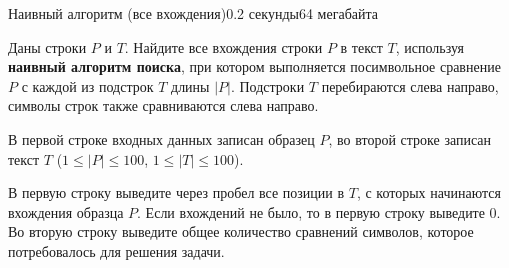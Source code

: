 \begin{problem}{Наивный алгоритм (все вхождения)}{}{}{0.2 секунды}{64 мегабайта}

Даны строки $P$ и $T$. Найдите все вхождения строки $P$ в текст $T$, используя {\bf наивный алгоритм поиска}, 
при котором выполняется посимвольное сравнение $P$ с каждой из подстрок $T$ длины $|P|$.
Подстроки $T$ перебираются слева направо, символы строк также сравниваются слева направо. 

\InputFile
В первой строке входных данных записан образец $P$, 
во второй строке записан текст $T$ ($1 \le |P| \le 100$, $1 \le |T| \le 100$).


\OutputFile
В первую строку выведите через пробел все позиции в $T$, с которых начинаются вхождения образца $P$. 
Если вхождений не было, то в первую строку выведите 0.
Во вторую строку выведите общее количество сравнений символов, которое потребовалось для решения задачи. 

\Examples

\begin{example}
%
\end{example}

\end{problem}
